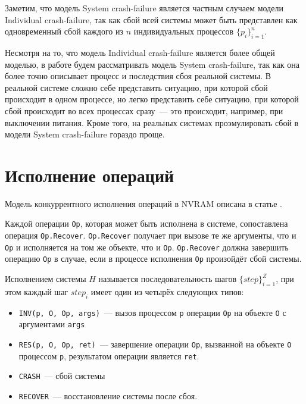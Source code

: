 \documentclass[times,specification,annotation]{itmo-student-thesis}
\begin{document}
\bigbreak

Заметим, что модель System crash-failure является частным случаем модели Individual crash-failure, так как сбой всей системы может быть представлен как одновременный сбой каждого из $n$ индивидуальных процессов $\{p_i\}_{i = 1}^n$.

Несмотря на то, что модель Individual crash-failure является более общей моделью, в работе будем рассматривать модель System crash-failure, так как она более точно описывает процесс и последствия сбоя реальной системы. В реальной системе сложно себе представить ситуацию, при которой сбой происходит в одном процессе, но легко представить себе ситуацию, при которой сбой происходит во всех процессах сразу~--- это происходит, например, при выключении питания. Кроме того, на реальных системах проэмулировать сбой в модели System crash-failure гораздо проще.

\section{Исполнение операций}

Модель конкуррентного исполнения операций в NVRAM описана в статье \cite{attiya2018nesting}.

Каждой операции \texttt{Op}, которая может быть исполнена в системе, сопоставлена операция \texttt{Op.Recover}.  \texttt{Op.Recover} получает при вызове те же аргументы, что и \texttt{Op} и исполняется на том же объекте, что и \texttt{Op}. \texttt{Op.Recover} должна завершить операцию \texttt{Op} в случае, если в процессе исполнения \texttt{Op} произойдёт сбой системы.

Исполнением системы $H$ называется последовательность шагов $\{step\}_{i = 1}^Z$, при этом каждый шаг $step_i$ имеет один из четырёх следующих типов:

\begin{itemize}
    \item \texttt{INV(p, O, Op, args)}~--- вызов процессом \texttt{p} операции \texttt{Op} на объекте \texttt{O} с аргументами \texttt{args}
    
    \item \texttt{RES(p, O, Op, ret)}~--- завершение операции \texttt{Op}, вызванной на объекте \texttt{O} процессом \texttt{p}, результатом операции является \texttt{ret}.
    
    \item \texttt{CRASH}~--- сбой системы
    
    \item \texttt{RECOVER}~--- восстановление системы после сбоя.
\end{itemize}
\end{document}
